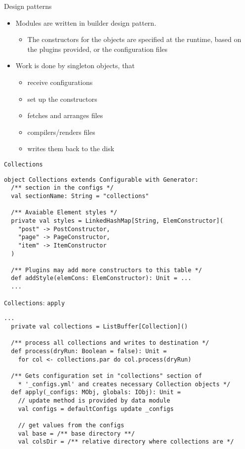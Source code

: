 \documentclass[compress, aspectratio=169]{beamer}
\begin{document}
\begin{frame}{Design patterns}
    \begin{itemize}
        \item Modules are written in builder design pattern. 
            \begin{itemize}
                \item The constructors for the objects are specified at the runtime,
                    based on the plugins provided, or the configuration files
            \end{itemize}
        \pause
        \item Work is done by singleton objects, that
            \begin{itemize}
                \item receive configurations
                \item set up the constructors
                \item fetches and arranges files
                \item compilers/renders files
                \item writes them back to the disk
            \end{itemize}
    \end{itemize}
\end{frame}

\begin{frame}[fragile]{\texttt{Collections}}
    \begin{lstlisting}[style=myscala]
object Collections extends Configurable with Generator:
  /** section in the configs */
  val sectionName: String = "collections"

  /** Avaiable Element styles */
  private val styles = LinkedHashMap[String, ElemConstructor](
    "post" -> PostConstructor,
    "page" -> PageConstructor,
    "item" -> ItemConstructor
  )

  /** Plugins may add more constructors to this table */
  def addStyle(elemCons: ElemConstructor): Unit = ...
  ...
    \end{lstlisting}
\end{frame}

\begin{frame}[fragile]{\texttt{Collections}: \texttt{apply}}
    \vspace{.5em}
    \begin{lstlisting}[style=myscala]
  ...
  private val collections = ListBuffer[Collection]()
  
  /** process all collections and writes to destination */
  def process(dryRun: Boolean = false): Unit =
    for col <- collections.par do col.process(dryRun)

  /** Gets configuration set in "collections" section of
    * '_configs.yml' and creates necessary Collection objects */
  def apply(_configs: MObj, globals: IObj): Unit =
    // update method is provided by data module
    val configs = defaultConfigs update _configs 

    // get values from the configs
    val base = /** base directory **/
    val colsDir = /** relative directory where collections are */
    \end{lstlisting}
\end{frame}
\end{document}
